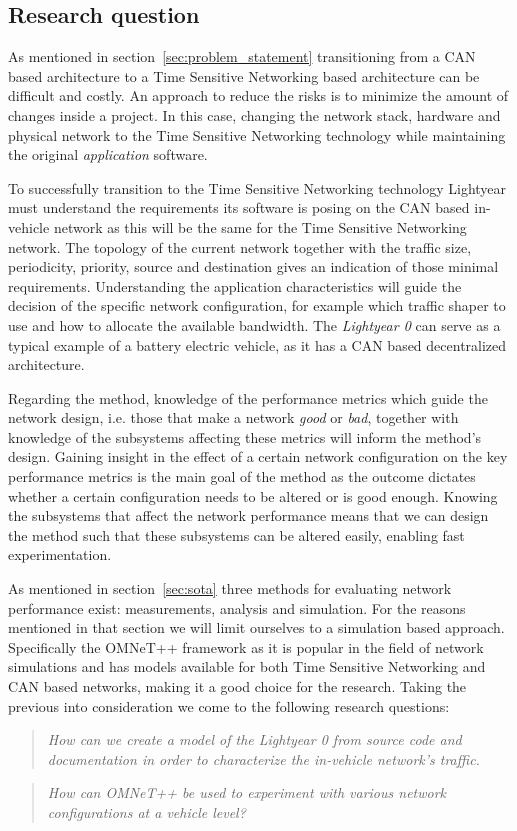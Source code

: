 \subsection{Research question}
\label{sec:research_question}
As mentioned in section~\ref{sec:problem_statement} transitioning from a CAN based architecture to a Time Sensitive Networking based architecture can be difficult and costly. An approach to reduce the risks is to minimize the amount of changes inside a project. In this case, changing the network stack, hardware and physical network to the Time Sensitive Networking technology while maintaining the original \textit{application} software.

To successfully transition to the Time Sensitive Networking technology Lightyear must understand the requirements its software is posing on the CAN based in-vehicle network as this will be the same for the Time Sensitive Networking network. The topology of the current network together with the traffic size, periodicity, priority, source and destination gives an indication of those minimal requirements. Understanding the application characteristics will guide the decision of the specific network configuration, for example which traffic shaper to use and how to allocate the available bandwidth. The \textit{Lightyear 0} can serve as a typical example of a battery electric vehicle, as it has a CAN based decentralized architecture.

Regarding the method, knowledge of the performance metrics which guide the network design, i.e. those that make a network \textit{good} or \textit{bad}, together with knowledge of the subsystems affecting these metrics will inform the method's design. Gaining insight in the effect of a certain network configuration on the key performance metrics is the main goal of the method as the outcome dictates whether a certain configuration needs to be altered or is good enough. Knowing the subsystems that affect the network performance means that we can design the method such that these subsystems can be altered easily, enabling fast experimentation.

As mentioned in section~\ref{sec:sota} three methods for evaluating network performance exist: measurements, analysis and simulation. For the reasons mentioned in that section we will limit ourselves to a simulation based approach. Specifically the OMNeT++ framework as it is popular in the field of network simulations and has models available for both Time Sensitive Networking and CAN based networks, making it a good choice for the research. Taking the previous into consideration we come to the following research questions:

\begin{quote}
    \emph{How can we create a model of the Lightyear 0 from source code and documentation in order to characterize the in-vehicle network's traffic.}
\end{quote}

\begin{quote}
    \emph{How can OMNeT++ be used to experiment with various network configurations at a vehicle level?}
\end{quote}